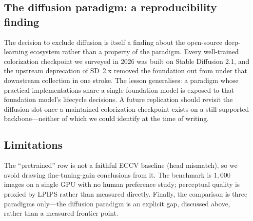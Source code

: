 \subsection{The diffusion paradigm: a reproducibility finding}
The decision to exclude diffusion is itself a finding about the open-source
deep-learning ecosystem rather than a property of the paradigm. Every
well-trained colorization checkpoint we surveyed in 2026 was built on Stable
Diffusion 2.1, and the upstream deprecation of SD~2.x removed the foundation
out from under that downstream collection in one stroke. The lesson generalises:
a paradigm whose practical implementations share a single foundation model is
exposed to that foundation model's lifecycle decisions. A future replication
should revisit the diffusion slot once a maintained colorization checkpoint
exists on a still-supported backbone---neither of which we could identify at
the time of writing.

\subsection{Limitations}
The ``pretrained'' row is not a faithful ECCV baseline (head mismatch), so we
avoid drawing fine-tuning-gain conclusions from it. The benchmark is $1{,}000$
images on a single GPU with no human preference study; perceptual quality is
proxied by LPIPS rather than measured directly. Finally, the comparison is
three paradigms only---the diffusion paradigm is an explicit gap, discussed
above, rather than a measured frontier point.

